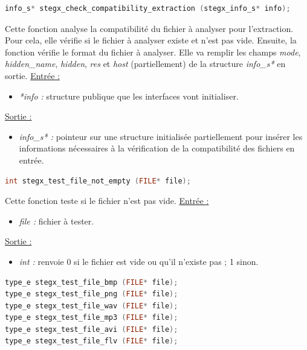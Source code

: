 \documentclass[11pt]{article}
\begin{document}
\begin{lstlisting}[language=c]
info_s* stegx_check_compatibility_extraction (stegx_info_s* info);
\end{lstlisting}

Cette fonction analyse la compatibilité du fichier à analyser pour l'extraction. 
Pour cela, elle vérifie si le fichier à analyser existe et n'est pas vide. 
Ensuite, la fonction vérifie le format du fichier à analyser. 
Elle va remplir les champs \textit{mode}, \textit{hidden\_name}, \textit{hidden},
\textit{res} et \textit{host} (partiellement) de la structure
\textit{info\_s*} en sortie. 
\newline
\underline{Entrée :}
\begin{itemize}
\item \textit{*info :} structure publique que les interfaces vont initialiser.
\end{itemize}
\underline{Sortie :}
\begin{itemize}
\item \textit{info\_s* :} pointeur sur une structure initialisée 
partiellement pour insérer les informations nécessaires à la vérification 
de la compatibilité des fichiers en entrée. 
\newline 
\end{itemize}

\begin{lstlisting}[language=c]
int stegx_test_file_not_empty (FILE* file);
\end{lstlisting}

Cette fonction teste si le fichier n'est pas vide. 
\newline
\underline{Entrée :}
\begin{itemize}
\item \textit{file :} fichier à tester.
\end{itemize}
\underline{Sortie :} 
\begin{itemize}
\item \textit{int :} renvoie 0 si le fichier est vide ou qu'il n'existe pas ; 1 sinon. 
\newline \end{itemize}

\begin{lstlisting}[language=c]
type_e stegx_test_file_bmp (FILE* file);
type_e stegx_test_file_png (FILE* file);
type_e stegx_test_file_wav (FILE* file);
type_e stegx_test_file_mp3 (FILE* file);
type_e stegx_test_file_avi (FILE* file);
type_e stegx_test_file_flv (FILE* file);
\end{lstlisting}
\end{document}
